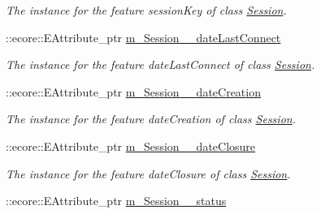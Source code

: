 \begin{DoxyCompactItemize}
\begin{DoxyCompactList}\small\item\em The instance for the feature sessionKey of class \hyperlink{classUMS__Data_1_1Session}{Session}. \item\end{DoxyCompactList}\item 
\hypertarget{classUMS__Data_1_1UMS__DataPackage_afd678e167a42fb76b9d816e6622f15fd}{
::ecore::EAttribute\_\-ptr \hyperlink{classUMS__Data_1_1UMS__DataPackage_afd678e167a42fb76b9d816e6622f15fd}{m\_\-Session\_\-\_\-dateLastConnect}}
\label{classUMS__Data_1_1UMS__DataPackage_afd678e167a42fb76b9d816e6622f15fd}

\begin{DoxyCompactList}\small\item\em The instance for the feature dateLastConnect of class \hyperlink{classUMS__Data_1_1Session}{Session}. \item\end{DoxyCompactList}\item 
\hypertarget{classUMS__Data_1_1UMS__DataPackage_afb364a3635f12fd561726fe8cb60c4e7}{
::ecore::EAttribute\_\-ptr \hyperlink{classUMS__Data_1_1UMS__DataPackage_afb364a3635f12fd561726fe8cb60c4e7}{m\_\-Session\_\-\_\-dateCreation}}
\label{classUMS__Data_1_1UMS__DataPackage_afb364a3635f12fd561726fe8cb60c4e7}

\begin{DoxyCompactList}\small\item\em The instance for the feature dateCreation of class \hyperlink{classUMS__Data_1_1Session}{Session}. \item\end{DoxyCompactList}\item 
\hypertarget{classUMS__Data_1_1UMS__DataPackage_a2160e74c0d972b9e2dbc927198b83746}{
::ecore::EAttribute\_\-ptr \hyperlink{classUMS__Data_1_1UMS__DataPackage_a2160e74c0d972b9e2dbc927198b83746}{m\_\-Session\_\-\_\-dateClosure}}
\label{classUMS__Data_1_1UMS__DataPackage_a2160e74c0d972b9e2dbc927198b83746}

\begin{DoxyCompactList}\small\item\em The instance for the feature dateClosure of class \hyperlink{classUMS__Data_1_1Session}{Session}. \item\end{DoxyCompactList}\item 
\hypertarget{classUMS__Data_1_1UMS__DataPackage_a57662dfdafb288ecc8a91e62389e9af2}{
::ecore::EAttribute\_\-ptr \hyperlink{classUMS__Data_1_1UMS__DataPackage_a57662dfdafb288ecc8a91e62389e9af2}{m\_\-Session\_\-\_\-status}}
\label{classUMS__Data_1_1UMS__DataPackage_a57662dfdafb288ecc8a91e62389e9af2}


\end{DoxyCompactItemize}
